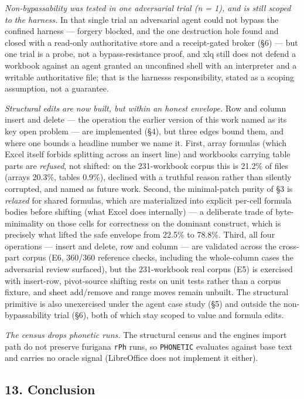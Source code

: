 \documentclass[
]{article}
\begin{document}
\emph{Non-bypassability was tested in one adversarial trial (n = 1), and
is still scoped to the harness.} In that single trial an adversarial
agent could not bypass the confined harness --- forgery blocked, and the
one destruction hole found and closed with a read-only authoritative
store and a receipt-gated broker (§6) --- but one trial is a probe, not
a bypass-resistance proof, and xlq still does not defend a workbook
against an agent granted an unconfined shell with an interpreter and a
writable authoritative file; that is the harness\textquotesingle s
responsibility, stated as a scoping assumption, not a guarantee.

\emph{Structural edits are now built, but within an honest envelope.}
Row and column insert and delete --- the operation the earlier version
of this work named as its key open problem --- are implemented (§4), but
three edges bound them, and where one bounds a headline number we name
it. First, array formulas (which Excel itself forbids splitting across
an insert line) and workbooks carrying table parts are \emph{refused},
not shifted: on the 231-workbook corpus this is 21.2\% of files (arrays
20.3\%, tables 0.9\%), declined with a truthful reason rather than
silently corrupted, and named as future work. Second, the minimal-patch
purity of §3 is \emph{relaxed} for shared formulas, which are
materialized into explicit per-cell formula bodies before shifting (what
Excel does internally) --- a deliberate trade of byte-minimality on
those cells for correctness on the dominant construct, which is
precisely what lifted the safe envelope from 22.5\% to 78.8\%. Third,
all four operations --- insert and delete, row and column --- are
validated across the cross-part corpus (E6, 360/360 reference checks,
including the whole-column cases the adversarial review surfaced), but
the 231-workbook real corpus (E5) is exercised with insert-row,
pivot-source shifting rests on unit tests rather than a corpus fixture,
and sheet add/remove and range moves remain unbuilt. The structural
primitive is also unexercised under the agent case study (§5) and
outside the non-bypassability trial (§6), both of which stay scoped to
value and formula edits.

\emph{The census drops phonetic runs.} The structural census and the
engine\textquotesingle s import path do not preserve furigana
\texttt{rPh} runs, so \texttt{PHONETIC} evaluates against base text and
carries no oracle signal (LibreOffice does not implement it either).

\subsection{13. Conclusion}\label{13-conclusion}
\end{document}
